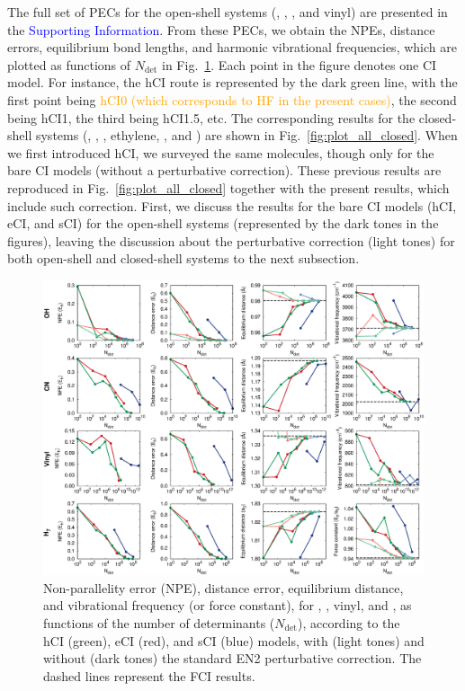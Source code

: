 \documentclass[aip,jcp,reprint,noshowkeys,superscriptaddress]{revtex4-1}
\newcommand{\fk}[1]{\textcolor{orange}{#1}}
\newcommand{\SupInf}{\textcolor{blue}{Supporting Information}}
\newcommand{\Ndet}{N_\text{det}}
\begin{document}
The full set of PECs for the open-shell systems (, , , and vinyl) are presented in the {\SupInf}.
From these PECs, we obtain the NPEs, distance errors, equilibrium bond lengths, and harmonic vibrational frequencies, which are plotted as functions of $\Ndet$ in Fig.~\ref{fig:plot_all}.
Each point in the figure denotes one CI model.
For instance, the hCI route is represented by the dark green line, with the first point being \fk{hCI0 (which corresponds to HF in the present cases)}, the second being hCI1, the third being hCI1.5, etc.
The corresponding results for the closed-shell systems (, , , ethylene, , and ) are shown in Fig.~\ref{fig:plot_all_closed}.
When we first introduced hCI, \cite{Kossoski_2022} we surveyed the same molecules, though only for the bare CI models (without a perturbative correction).
These previous results are reproduced in Fig.~\ref{fig:plot_all_closed} together with the present results, which include such correction.
First, we discuss the results for the bare CI models (hCI, eCI, and sCI) for the open-shell systems (represented by the dark tones in the figures),
leaving the discussion about the perturbative correction (light tones) for both open-shell and closed-shell systems to the next subsection.

\begin{figure}%
\includegraphics[width=1.0\linewidth]{plot_all}
\caption{
Non-parallelity error (NPE), distance error, equilibrium distance, and vibrational frequency (or force constant), for , , vinyl, and ,
as functions of the number of determinants ($\Ndet$), according to the hCI (green), eCI (red), and sCI (blue) models,
with (light tones) and without (dark tones) the standard EN2 perturbative correction.
The dashed lines represent the FCI results.}
\label{fig:plot_all}
\end{figure}
\end{document}
